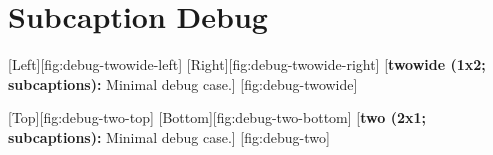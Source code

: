 \documentclass[12pt,letterpaper]{article}
\begin{document}
\section*{Subcaption Debug}

\figfloat
    {
        \figtwowide
        {[Left][fig:debug-twowide-left]}
        {[Right][fig:debug-twowide-right]}
    }
    [\textbf{twowide (1x2; subcaptions):} Minimal debug case.]
    [fig:debug-twowide]

\figfloat
    {
        \figtwo
        {[Top][fig:debug-two-top]}
        {[Bottom][fig:debug-two-bottom]}
    }
    [\textbf{two (2x1; subcaptions):} Minimal debug case.]
    [fig:debug-two]
\end{document}
